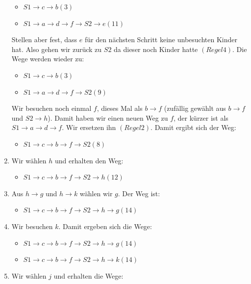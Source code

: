 \begin{enumerate}
	\begin{itemize}
		\item $S1\rightarrow c\rightarrow b(3)$
		\item $S1\rightarrow a\rightarrow d\rightarrow f\rightarrow S2\rightarrow e(11)$
	\end{itemize}
	Stellen aber fest, dass $e$ f\"ur den n\"achsten Schritt keine unbesuchten Kinder hat. Also gehen wir zur\"uck zu $S2$ da dieser noch Kinder hatte $(Regel 4)$. Die Wege werden wieder zu:
	\begin{itemize}
		\item $S1\rightarrow c\rightarrow b(3)$
		\item $S1\rightarrow a\rightarrow d\rightarrow f\rightarrow S2(9)$
	\end{itemize}
	Wir besuchen noch einmal $f$, dieses Mal als $b\rightarrow f$ (zuf\"allig gew\"ahlt aus $b\rightarrow f$ und $S2\rightarrow h$). Damit haben wir einen neuen Weg zu $f$, der k\"urzer ist als $S1\rightarrow a\rightarrow d\rightarrow f$. Wir ersetzen ihn $(Regel 2)$. Damit ergibt sich der Weg:
	\begin{itemize}
		\item $S1\rightarrow c\rightarrow b\rightarrow f\rightarrow S2(8)$
	\end{itemize}	\item Wir w\"ahlen $h$ und erhalten den Weg:
	\begin{itemize}
		\item $S1\rightarrow c\rightarrow b\rightarrow f\rightarrow S2\rightarrow h(12)$
	\end{itemize}
	\item Aus $h\rightarrow g$ und $h\rightarrow k$ w\"ahlen wir $g$. Der Weg ist:
	\begin{itemize}
		\item $S1\rightarrow c\rightarrow b\rightarrow f\rightarrow S2\rightarrow h\rightarrow g(14)$
	\end{itemize}
	\item Wir besuchen $k$. Damit ergeben sich die Wege:
	\begin{itemize}
		\item $S1\rightarrow c\rightarrow b\rightarrow f\rightarrow S2\rightarrow h\rightarrow g(14)$
		\item $S1\rightarrow c\rightarrow b\rightarrow f\rightarrow S2\rightarrow h\rightarrow k(14)$
	\end{itemize}
	\item Wir w\"ahlen $j$ und erhalten die Wege: 
	\begin{itemize}

\end{itemize}
\end{enumerate}

